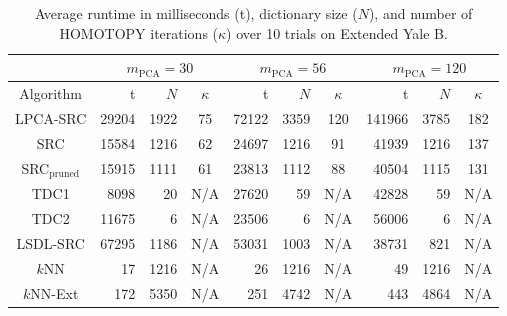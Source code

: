 \documentclass[review]{elsarticle}
\begin{document}
\begin{table}[!htb] 
\small{
\centering
\begin{tabular}{|c|r|r|c|r|r|c|r|r|c|}
\hline
& \multicolumn{3}{|c|}{$m_{\mathrm{PCA}} = 30$} & \multicolumn{3}{|c|}{$m_{\mathrm{PCA}} = 56$} & \multicolumn{3}{|c|}{$m_{\mathrm{PCA}} = 120$} \\
\hline
Algorithm & t & $N$ & $\kappa$ & t & $N$ & $\kappa$ & t & $N$ & $\kappa$ \\
\hline
LPCA-SRC	& 29204	& 1922	& 75	& 72122	& 3359	& 120	& 141966	& 3785	& 182 \\
SRC	& 15584	& 1216	& 62	& 24697	& 1216	& 91	& 41939	& 1216	& 137 \\
SRC$_\mathrm{pruned}$ & 15915	& 1111	& 61	& 23813	& 1112	& 88	& 40504	& 1115	& 131 \\
TDC1 &	8098	&	20	&	N/A	&	27620	&	59	&	N/A	&	42828	&	59	&	N/A	\\
TDC2 &	11675	&	6	&	N/A	&	23506	&	6	&	N/A	&	56006	&	6	&	N/A	\\
LSDL-SRC	& 67295	& 1186	& N/A	& 53031	& 1003	& N/A	& 38731	& 821	& N/A \\
$k$NN &	17	& 1216 & N/A &	26	& 1216 & N/A &	49	& 1216 & N/A \\
$k$NN-Ext &	172	& 5350 & N/A &	251	& 4742 & N/A &	443	& 4864 & N/A \\	
\hline
\end{tabular}
\caption{Average runtime in milliseconds (t), dictionary size ($N$), and number of HOMOTOPY iterations ($\kappa$) over 10 trials on Extended Yale B.} 
\label{Ext_Yale_B_time}}
\end{table}
\end{document}
